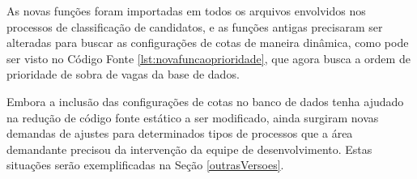As novas funções foram importadas em todos os arquivos envolvidos nos processos de classificação de candidatos, e as funções antigas precisaram ser alteradas para buscar as configurações de cotas de maneira dinâmica, como pode ser visto no Código Fonte \ref{lst:novafuncaoprioridade}, que agora busca a ordem de prioridade de sobra de vagas da base de dados. 





Embora a inclusão das configurações de cotas no banco de dados tenha ajudado na redução de código fonte estático a ser modificado, ainda surgiram novas demandas de ajustes para determinados tipos de processos que a área demandante precisou da intervenção da equipe de desenvolvimento. Estas situações serão exemplificadas na Seção \ref{outrasVersoes}.